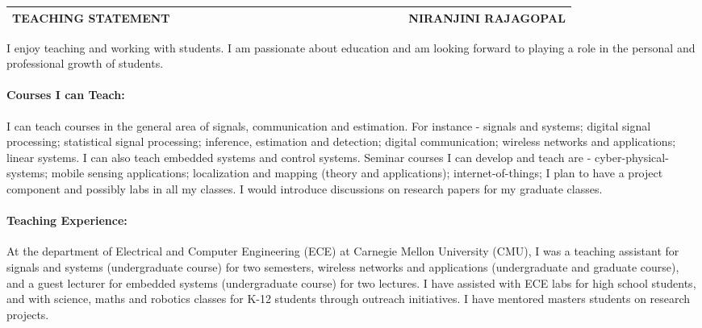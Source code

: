 \documentclass[10pt]{article}
\date{}
\begin{document}

\begin{table}
\color{blue}
\begin{tabular*}{\textwidth}{l r}
\large\textbf{TEACHING STATEMENT} & 
\hfill \ \ \ \ \ \ \ \ \ \ \ \ \ \ \ \ \ \ \ \
\ \ \ \ \ \ \ \ \ \ \ \ \ \ \ 
\large\textbf{NIRANJINI RAJAGOPAL}\\
\hline
\end{tabular*}

\end{table}


I enjoy teaching and working with students. I am passionate about education and am looking forward to playing a role in the personal and professional growth of students. 


\paragraph{Courses I can Teach:}
I can teach courses in the general area of signals, communication and estimation. For instance - signals and systems;  digital signal processing; statistical signal processing; inference, estimation and detection; digital communication; wireless networks and applications; linear systems. I can also teach embedded systems and control systems. 
Seminar courses I can develop and teach are - cyber-physical-systems; mobile sensing applications; localization and mapping (theory and applications); internet-of-things; 
I plan to have a project component and possibly labs in all my classes. I would introduce discussions on research papers for my graduate classes.

\paragraph{Teaching Experience:}
At the department of Electrical and Computer Engineering (ECE) at Carnegie Mellon University (CMU), I was a teaching assistant for signals and systems (undergraduate course) for two semesters, wireless networks and applications (undergraduate and graduate course), and a guest lecturer for embedded systems (undergraduate course) for two lectures. I have assisted with ECE labs for high school students, and with science, maths and robotics classes for K-12 students through outreach initiatives. I have mentored masters students on research projects. \\
\end{document}
